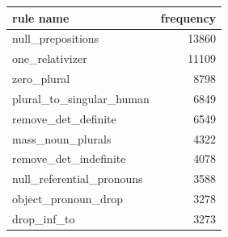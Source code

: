 \documentclass[11pt]{article}
\begin{document}
\begin{center}
\begin{tabular}{lr}
\hline
\textbf{rule name}          & \textbf{frequency} \\ \hline
null\_prepositions          & 13860              \\
one\_relativizer            & 11109              \\
zero\_plural                & 8798               \\
plural\_to\_singular\_human & 6849               \\
remove\_det\_definite       & 6549               \\
mass\_noun\_plurals         & 4322               \\
remove\_det\_indefinite     & 4078               \\
null\_referential\_pronouns & 3588               \\
object\_pronoun\_drop       & 3278               \\
drop\_inf\_to               & 3273               \\ \hline
\end{tabular}
\end{center}
\end{document}
